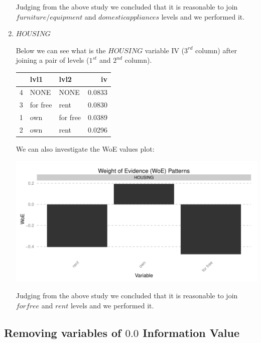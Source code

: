 \documentclass[10pt]{article}\usepackage[]{graphicx}\usepackage[]{color}
\newenvironment{knitrout}{}{} %
\begin{document}
\begin{enumerate}
\begin{knitrout}
\end{knitrout}

Judging from the above study we concluded that it is reasonable to join $furniture/equipment$ and $domestic appliances$ levels and we performed it. 

\item $HOUSING$



Below we can see what is the $HOUSING$ variable IV ($3^{rd}$ column) after joining a pair of levels ($1^{st}$ and $2^{nd}$ column). 

\begin{knitrout}
\color{fgcolor}
\begin{tabular}{l|l|l|r}
\hline
  & lvl1 & lvl2 & iv\\
\hline
4 & NONE & NONE & 0.0833\\
\hline
3 & for free & rent & 0.0830\\
\hline
1 & own & for free & 0.0389\\
\hline
2 & own & rent & 0.0296\\
\hline
\end{tabular}


\end{knitrout}

We can also investigate the WoE values plot: 

\begin{knitrout}
\color{fgcolor}
\includegraphics[width=.65\linewidth]{figure/unnamed-chunk-13-1} 

\end{knitrout}

Judging from the above study we concluded that it is reasonable to join $for free$ and $rent$ levels and we performed it. 
\end{enumerate}


\subsection{Removing variables of $0.0$ Information Value}
\end{document}
